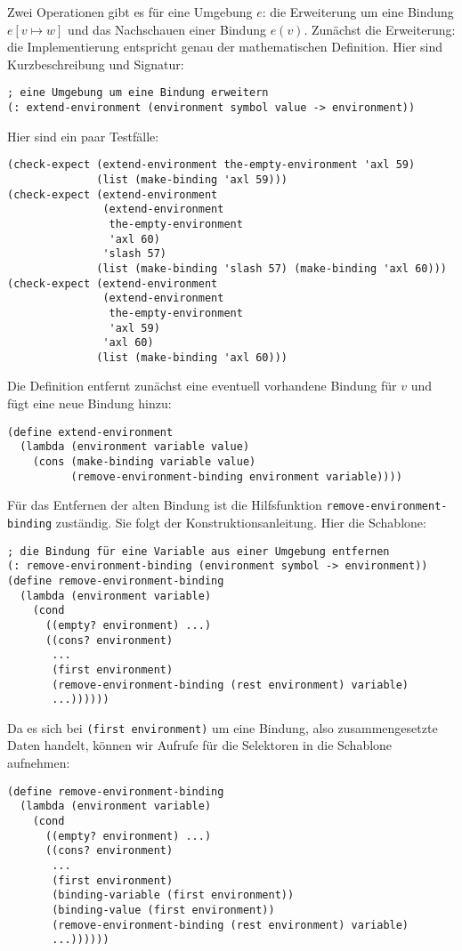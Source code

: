 Zwei Operationen gibt es für eine Umgebung $e$: die Erweiterung um
eine Bindung $e[v\mapsto w]$ und das Nachschauen einer Bindung $e(v)$.
Zunächst die Erweiterung: die Implementierung entspricht genau der
mathematischen Definition.  Hier sind Kurzbeschreibung und Signatur:
% 
\begin{lstlisting}
; eine Umgebung um eine Bindung erweitern
(: extend-environment (environment symbol value -> environment))
\end{lstlisting}
%
Hier sind ein paar Testfälle:
%
\begin{lstlisting}
(check-expect (extend-environment the-empty-environment 'axl 59)
              (list (make-binding 'axl 59)))
(check-expect (extend-environment
               (extend-environment
                the-empty-environment
                'axl 60)
               'slash 57)
              (list (make-binding 'slash 57) (make-binding 'axl 60)))
(check-expect (extend-environment
               (extend-environment
                the-empty-environment
                'axl 59)
               'axl 60)
              (list (make-binding 'axl 60)))
\end{lstlisting}
%
Die Definition entfernt zunächst eine eventuell vorhandene Bindung
für $v$ und fügt eine neue Bindung hinzu:
%
\begin{lstlisting}
(define extend-environment
  (lambda (environment variable value)
    (cons (make-binding variable value)
          (remove-environment-binding environment variable))))
\end{lstlisting}
%
Für das Entfernen der alten Bindung ist die Hilfsfunktion
\lstinline{remove-environment-binding} zuständig.  Sie folgt der
Konstruktionsanleitung.  Hier die Schablone:
%
\begin{lstlisting}
; die Bindung für eine Variable aus einer Umgebung entfernen
(: remove-environment-binding (environment symbol -> environment))
(define remove-environment-binding
  (lambda (environment variable)
    (cond
      ((empty? environment) ...)
      ((cons? environment)
       ...
       (first environment)
       (remove-environment-binding (rest environment) variable)
       ...))))))
\end{lstlisting}
%
Da es sich bei \lstinline{(first environment)} um eine Bindung, also
zusammengesetzte Daten handelt, können wir Aufrufe für die Selektoren
in die Schablone aufnehmen:
%
\begin{lstlisting}
(define remove-environment-binding
  (lambda (environment variable)
    (cond
      ((empty? environment) ...)
      ((cons? environment)
       ...
       (first environment)
       (binding-variable (first environment))
       (binding-value (first environment))
       (remove-environment-binding (rest environment) variable)
       ...))))))
\end{lstlisting}
